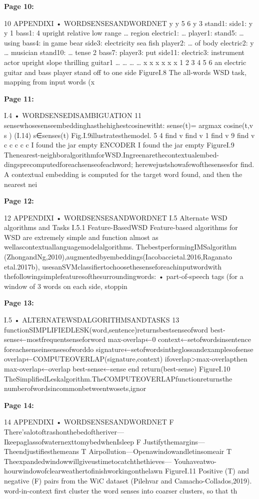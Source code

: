 \documentclass[11pt,a4paper]{article}
\begin{document}
\textbf{Page 10:}

10 APPENDIXI • WORDSENSESANDWORDNET
y y
5 6
y
3
stand1: side1:
y y
1 bass1: 4 upright relative
low range … region
electric1: … player1: stand5: …
using bass4: in game bear side3:
electricity sea fish player2: … of body
electric2: y … musician stand10: …
tense 2 bass7: player3: put side11:
electric3: instrument actor upright slope
thrilling guitar1 … … … …
x x x x x x
1 2 3 4 5 6
an electric guitar and bass player stand off to one side
FigureI.8 The all-words WSD task, mapping from input words (x

\textbf{Page 11:}

I.4 • WORDSENSEDISAMBIGUATION 11
sensewhosesenseembeddinghasthehighestcosinewitht:
sense(t)= argmax cosine(t,v s ) (I.14)
s∈senses(t)
Fig.I.9illustratesthemodel.
5
4 find v
find
v 1
find
v
9
find
v
c c c c c
I found the jar empty
ENCODER
I found the jar empty
FigureI.9 Thenearest-neighboralgorithmforWSD.Ingreenarethecontextualembed-
dingsprecomputedforeachsenseofeachword; herewejustshowafewofthesensesfor
find. A contextual embedding is computed for the target word found, and then the nearest
nei

\textbf{Page 12:}

12 APPENDIXI • WORDSENSESANDWORDNET
I.5 Alternate WSD algorithms and Tasks
I.5.1 Feature-BasedWSD
Feature-based algorithms for WSD are extremely simple and function almost as
wellascontextuallanguagemodelalgorithms. ThebestperformingIMSalgorithm
(ZhongandNg,2010),augmentedbyembeddings(Iacobaccietal.2016,Raganato
etal.2017b), usesanSVMclassifiertochoosethesenseforeachinputwordwith
thefollowingsimplefeaturesofthesurroundingwords:
• part-of-speech tags (for a window of 3 words on each side, stoppin

\textbf{Page 13:}

I.5 • ALTERNATEWSDALGORITHMSANDTASKS 13
functionSIMPLIFIEDLESK(word,sentence)returnsbestsenseofword
best-sense←mostfrequentsenseforword
max-overlap←0
context←setofwordsinsentence
foreachsenseinsensesofworddo
signature←setofwordsintheglossandexamplesofsense
overlap←COMPUTEOVERLAP(signature,context)
ifoverlap>max-overlapthen
max-overlap←overlap
best-sense←sense
end
return(best-sense)
FigureI.10 TheSimplifiedLeskalgorithm.TheCOMPUTEOVERLAPfunctionreturnsthe
numberofwordsincommonbetweentwosets,ignor

\textbf{Page 14:}

14 APPENDIXI • WORDSENSESANDWORDNET
F There’salotoftrashonthebedoftheriver—
IkeepaglassofwaternexttomybedwhenIsleep
F Justifythemargins—Theendjustifiesthemeans
T Airpollution—Openawindowandletinsomeair
T Theexpandedwindowwillgiveustimetocatchthethieves—
Youhaveatwo-hourwindowofclearweathertofinishworkingonthelawn
FigureI.11 Positive (T) and negative (F) pairs from the WiC dataset (Pilehvar and
Camacho-Collados,2019).
word-in-context first cluster the word senses into coarser clusters, so that th
\end{document}
